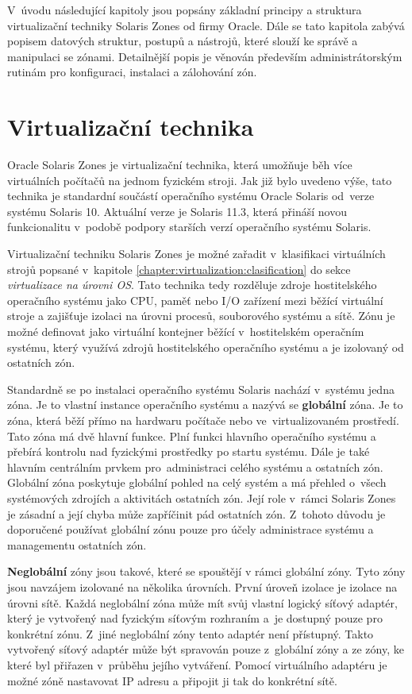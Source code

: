V~úvodu následující kapitoly jsou popsány základní principy a struktura virtualizační techniky Solaris Zones od
firmy Oracle. Dále se tato kapitola zabývá popisem datových struktur, postupů a nástrojů, které slouží ke správě a manipulaci
se zónami. Detailnější popis je věnován především administrátorským rutinám pro konfiguraci, instalaci a zálohování zón.
\section{Virtualizační technika}
\label{chapter:zones:technique}
Oracle Solaris Zones je virtualizační technika, která umožňuje běh více virtuálních počítačů na jednom fyzickém stroji. Jak
již bylo uvedeno výše, tato technika je standardní součástí operačního systému Oracle Solaris od~verze systému Solaris 10.
Aktuální verze je Solaris 11.3, která přináší novou funkcionalitu v~podobě podpory starších verzí operačního systému Solaris.

Virtualizační techniku Solaris Zones je možné zařadit v~klasifikaci virtuálních strojů popsané v~kapitole \ref{chapter:virtualization:clasification}
do sekce \textit{virtualizace na úrovni OS}. Tato technika tedy rozděluje zdroje hostitelského
operačního systému jako CPU, paměť nebo I/O zařízení mezi běžící virtuální stroje a zajišťuje izolaci na úrovni procesů,
souborového systému a sítě. Zónu je možné definovat jako virtuální kontejner běžící v~hostitelském operačním systému, který
využívá zdrojů hostitelského operačního systému a je izolovaný od ostatních zón.

Standardně se po instalaci operačního systému Solaris nachází v~systému jedna zóna. Je to vlastní instance operačního systému
a nazývá se \textbf{globální} zóna. Je to zóna, která běží přímo na hardwaru počítače nebo ve~virtualizovaném
prostředí. Tato zóna má dvě hlavní funkce. Plní funkci hlavního operačního systému a přebírá kontrolu
nad fyzickými prostředky po startu systému. Dále je také hlavním centrálním prvkem pro~administraci celého systému a ostatních
zón. Globální zóna poskytuje globální pohled na celý systém a má přehled o~všech systémových zdrojích a aktivitách ostatních
zón. Její role v~rámci Solaris Zones je zásadní a její chyba může zapříčinit pád ostatních zón. Z~tohoto důvodu je doporučené
používat globální zónu pouze pro účely administrace systému a managementu ostatních zón.

\textbf{Neglobální} zóny jsou takové, které se spouštějí v rámci globální zóny. Tyto zóny jsou navzájem izolované na
několika úrovních. První úroveň izolace je izolace na úrovni sítě. Každá neglobální zóna může mít svůj vlastní logický síťový
adaptér, který je vytvořený nad fyzickým síťovým rozhraním a~je dostupný pouze pro konkrétní zónu. Z~jiné neglobální
zóny tento adaptér není přístupný. Takto vytvořený síťový adaptér může být spravován pouze z~globální zóny a ze zóny, ke které
byl přiřazen v~průběhu jejího vytváření. Pomocí virtuálního adaptéru je možné zóně nastavovat IP adresu a připojit ji tak
do konkrétní sítě.

